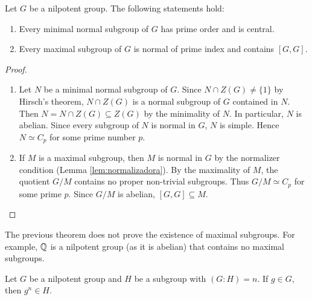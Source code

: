 \begin{theorem}
Let $G$ be a nilpotent group. The following statements hold: 
\begin{enumerate}
\item Every minimal normal subgroup of $G$ has prime order and is central. 
\item Every maximal subgroup of $G$ is normal of prime index and contains $[G,G]$. 
\end{enumerate}
\end{theorem}

\begin{proof}\
\begin{enumerate}
    \item Let $N$ be a minimal normal subgroup of $G$. Since 
        $N\cap Z(G)\ne\{1\}$ by Hirsch's theorem, $N\cap Z(G)$ is a normal subgroup of 
        $G$ contained in $N$. Then $N=N\cap Z(G)\subseteq
	Z(G)$ by the minimality of $N$. In particular, $N$ is abelian. Since every subgroup of 
         $N$ is normal in $G$, $N$ is simple. Hence $N\simeq
	C_p$ for some prime number $p$.
 \item  If $M$ is a maximal subgroup, then $M$
is normal in $G$ by the normalizer condition (Lemma \ref{lem:normalizadora}). By the maximality
of $M$, the quotient $G/M$ contains no proper non-trivial subgroups. Thus 
$G/M\simeq C_p$ for some prime $p$. Since 
	$G/M$ is abelian, $[G,G]\subseteq M$. \qedhere 
\end{enumerate}
\end{proof}

The previous theorem does not prove the existence of maximal subgroups. For example, 
$\mathbb{Q}$ is a nilpotent group (as it is abelian) 
that contains no maximal subgroups. 

\begin{proposition}
\label{pro:g^n}
Let $G$ be a nilpotent group and $H$ be a subgroup with $(G:H)=n$. If 
$g\in G$, then $g^n\in H$.
\end{proposition}

